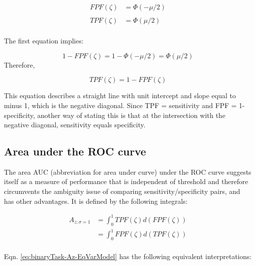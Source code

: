 \documentclass[
]{book}
\begin{document}
\begin{equation} 
\begin{aligned} 
FPF\left ( \zeta \right ) &=\Phi\left ( -\mu/2 \right )\\
\\
TPF\left ( \zeta \right ) &=\Phi\left (\mu/2 \right )\\ 
\end{aligned} 
\label{eq:binaryTask-NegDiagIntersection}
\end{equation}

The first equation implies:

\[1-FPF\left ( \zeta \right ) =1-\Phi\left ( -\mu/2 \right )= \Phi\left ( \mu/2 \right )\]
Therefore,

\begin{equation} 
TPF\left ( \zeta \right ) = 1-FPF\left ( \zeta \right )
\label{eq:binaryTask-NegDiagIntersection2}
\end{equation}

This equation describes a straight line with unit intercept and slope equal to minus 1, which is the negative diagonal. Since TPF = sensitivity and FPF = 1- specificity, another way of stating this is that at the intersection with the negative diagonal, sensitivity equals specificity.

\hypertarget{area-under-the-roc-curve}{%
\subsection{Area under the ROC curve}\label{area-under-the-roc-curve}}

The area AUC (abbreviation for area under curve) under the ROC curve suggests itself as a measure of performance that is independent of threshold and therefore circumvents the ambiguity issue of comparing sensitivity/specificity pairs, and has other advantages. It is defined by the following integrals:

\begin{equation} 
\begin{aligned}
A_{z;\sigma = 1} &= \int_{0}^{1}TPF(\zeta)d(FPF(\zeta))\\
&=\int_{0}^{1}FPF(\zeta)d(TPF(\zeta))\\
\end{aligned}
\label{eq:binaryTask-Az-EqVarModel}
\end{equation}

Eqn. \eqref{eq:binaryTask-Az-EqVarModel} has the following equivalent interpretations:
\end{document}
